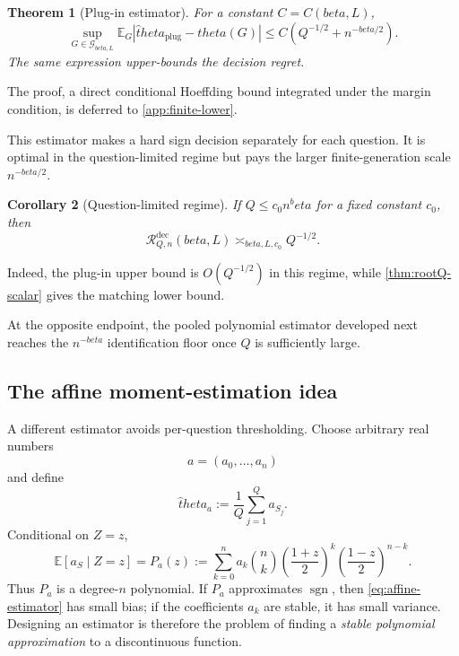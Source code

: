 \documentclass[11pt]{article}
\def\beta{beta}%
\def\theta{theta}%
\newtheorem{theorem}{Theorem}[section]
\newtheorem{corollary}[theorem]{Corollary}
\newcommand{\E}{\mathbb E}
\newcommand{\sgn}{\operatorname{sgn}}
\newcommand{\calG}{\mathcal G}
\newcommand{\calR}{\mathcal R}
\newcommand\eed[1]{{\color{green!45!black} #1}}
\begin{document}
\begin{theorem}[Plug-in estimator]
\label{thm:plugin-scalar}
For a constant $C=C(\beta,L)$,
\begin{equation}
\label{eq:plugin-scalar}
\sup_{G\in\calG_{\beta,L}}
\E_G|\widehat\theta_{\mathrm{plug}}-\theta(G)|
\le
C\left(Q^{-1/2}+n^{-\beta/2}\right).
\end{equation}
The same expression upper-bounds the decision regret.
\end{theorem}
The proof, a direct conditional Hoeffding bound integrated under the margin condition, is deferred to \cref{app:finite-lower}.

This estimator makes a hard sign decision separately for each question.  It is optimal in the question-limited regime but pays the larger finite-generation scale $n^{-\beta/2}$.

\begin{corollary}[Question-limited regime]
\label{cor:question-limited}
If $Q\le c_0 n^\beta$ for a fixed constant $c_0$, then
\begin{equation}
\label{eq:question-limited}
\calR^{\mathrm{dec}}_{Q,n}(\beta,L)
\asymp_{\beta,L,c_0}
Q^{-1/2}.
\end{equation}
\end{corollary}
\eed{Indeed, the plug-in upper bound is $O(Q^{-1/2})$ in this regime, while \cref{thm:rootQ-scalar} gives the matching lower bound.}

\eed{At the opposite endpoint, the pooled polynomial estimator developed next reaches the $n^{-\beta}$ identification floor once $Q$ is sufficiently large.}

\subsection{The affine moment-estimation idea}

A different estimator avoids per-question thresholding.  Choose arbitrary real numbers
\[
a=(a_0,\dots,a_n)
\]
and define
\begin{equation}
\label{eq:affine-estimator}
\widehat\theta_a
:=
\frac1Q\sum_{j=1}^Q a_{S_j}.
\end{equation}
Conditional on $Z=z$,
\begin{equation}
\label{eq:Pa}
\E[a_S\mid Z=z]
=
P_a(z)
:=
\sum_{k=0}^n a_k
\binom nk
\left(\frac{1+z}{2}\right)^k
\left(\frac{1-z}{2}\right)^{n-k}.
\end{equation}
Thus $P_a$ is a degree-$n$ polynomial.  If $P_a$ approximates $\sgn$, then \eqref{eq:affine-estimator} has small bias; if the coefficients $a_k$ are stable, it has small variance.  Designing an estimator is therefore the problem of finding a \emph{stable polynomial approximation} to a discontinuous function.
\end{document}
